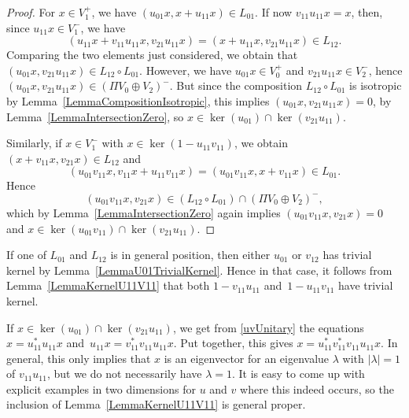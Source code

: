 \documentclass[10pt,a4paper]{amsart}
\numberwithin{equation}{section}
\begin{document}
\begin{proof}
For $x \in V_1^+$, we have $(u_{01} x, x+u_{11}x) \in L_{01}$.
If now $v_{11} u_{11} x = x$,
then, since $u_{11} x \in V_1^-$, we have
\begin{equation*}
 (u_{11} x + v_{11} u_{11} x, v_{21} u_{11} x) = (x + u_{11} x, v_{21} u_{11} x) \in L_{12}.
\end{equation*}
Comparing the two elements just considered, we obtain that $(u_{01} x, v_{21} u_{11} x) \in L_{12} \circ L_{01}$.
However, we have $u_{01} x \in V_0^+$ and $v_{21}u_{11}x \in V_2^-$, hence $(u_{01} x, v_{21} u_{11} x) \in (\Pi V_0 \oplus V_2)^-$.
But since the composition $L_{12} \circ L_{01}$ is isotropic by Lemma~\ref{LemmaCompositionIsotropic}, this implies $(u_{01} x, v_{21} u_{11} x) = 0$, by Lemma~\ref{LemmaIntersectionZero}, so $x \in \ker(u_{01}) \cap \ker(v_{21} u_{11})$.

Similarly, if $x \in V_1^-$ with $x \in\ker(1 - u_{11} v_{11})$, we obtain $(x+v_{11}x, v_{21}x) \in L_{12}$ and
\begin{equation*}
 (u_{01} v_{11} x, v_{11} x + u_{11} v_{11} x) = (u_{01} v_{11} x, x + v_{11} x) \in L_{01}.
\end{equation*}
Hence \[(u_{01} v_{11} x, v_{21} x) \in (L_{12} \circ L_{01}) \cap (\Pi V_0 \oplus V_2)^-,\] which by Lemma~\ref{LemmaIntersectionZero} again implies $(u_{01} v_{11} x, v_{21} x) = 0$ and $x \in \ker(u_{01} v_{11}) \cap \ker(v_{21} u_{11})$.
\end{proof}

\begin{Remark}
If one of $L_{01}$ and $L_{12}$ is in general position, then either $u_{01}$ or $v_{12}$ has trivial kernel by Lemma~\ref{LemmaU01TrivialKernel}.
Hence in that case, it follows from Lemma~\ref{LemmaKernelU11V11} that both $1 - v_{11} u_{11}$ and~${1- u_{11}v_{11}}$ have trivial kernel.
\end{Remark}

\begin{Remark}
If $x \in \ker(u_{01}) \cap \ker(v_{21} u_{11})$, we get from \eqref{uvUnitary} the equations $x = u_{11}^* u_{11} x$ and~${u_{11} x = v_{11}^* v_{11} u_{11}x}$.
Put together, this gives $x = u_{11}^* v_{11}^* v_{11} u_{11} x$.
In general, this only implies that $x$ is an eigenvector for an eigenvalue $\lambda$ with $|\lambda| = 1$ of $v_{11} u_{11}$, but we do not necessarily have $\lambda = 1$.
It is easy to come up with explicit examples in two dimensions for $u$ and $v$ where this indeed occurs, so the inclusion of Lemma~\ref{LemmaKernelU11V11} is general proper.
\end{Remark}
\end{document}
